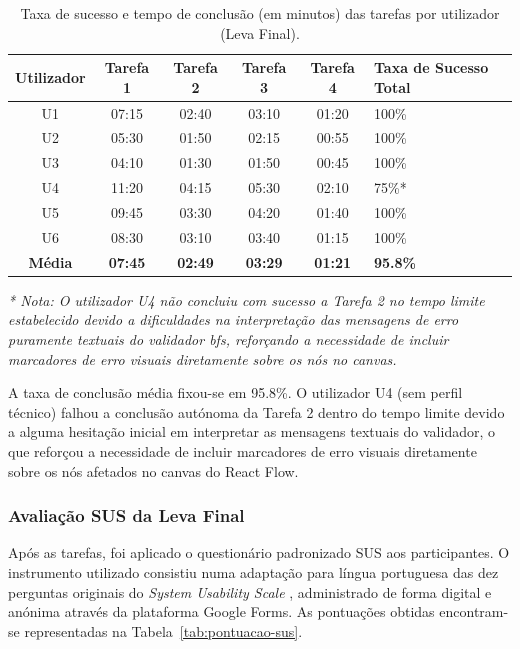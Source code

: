 \begin{table}[!htbp]
\centering
\caption{Taxa de sucesso e tempo de conclusão (em minutos) das tarefas por utilizador (Leva Final).}
\label{tab:resultados-tarefas}
\begin{tabularx}{\textwidth}{cCCCCL}
\toprule
\textbf{Utilizador} & \textbf{Tarefa 1} & \textbf{Tarefa 2} & \textbf{Tarefa 3} & \textbf{Tarefa 4} & \textbf{Taxa de Sucesso Total} \\
\midrule
U1 & 07:15 & 02:40 & 03:10 & 01:20 & 100\% \\
U2 & 05:30 & 01:50 & 02:15 & 00:55 & 100\% \\
U3 & 04:10 & 01:30 & 01:50 & 00:45 & 100\% \\
U4 & 11:20 & 04:15 & 05:30 & 02:10 & 75\%* \\
U5 & 09:45 & 03:30 & 04:20 & 01:40 & 100\% \\
U6 & 08:30 & 03:10 & 03:40 & 01:15 & 100\% \\
\midrule
\textbf{Média} & \textbf{07:45} & \textbf{02:49} & \textbf{03:29} & \textbf{01:21} & \textbf{95.8\%} \\
\bottomrule
\end{tabularx}

\smallskip
\begin{minipage}{\linewidth}
\centering
\small \textit{* Nota: O utilizador U4 não concluiu com sucesso a Tarefa 2 no tempo limite estabelecido devido a dificuldades na interpretação das mensagens de erro puramente textuais do validador \gls{bfs}, reforçando a necessidade de incluir marcadores de erro visuais diretamente sobre os nós no canvas.}
\end{minipage}
\end{table}

A taxa de conclusão média fixou-se em 95.8\%. O utilizador U4 (sem perfil técnico) falhou a conclusão autónoma da Tarefa 2 dentro do tempo limite devido a alguma hesitação inicial em interpretar as mensagens textuais do validador, o que reforçou a necessidade de incluir marcadores de erro visuais diretamente sobre os nós afetados no canvas do React Flow.

\subsubsection{Avaliação SUS da Leva Final}
Após as tarefas, foi aplicado o questionário padronizado SUS aos participantes. O instrumento utilizado consistiu numa adaptação para língua portuguesa das dez perguntas originais do \textit{System Usability Scale} \citep{Brooke1996, Martins2015}, administrado de forma digital e anónima através da plataforma Google Forms. As pontuações obtidas encontram-se representadas na Tabela~\ref{tab:pontuacao-sus}.

